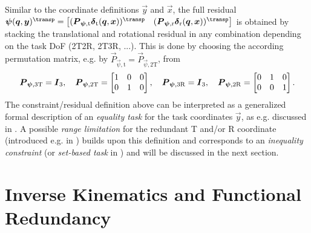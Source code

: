 \documentclass[graybox,vecphys]{svmult}
\newcommand{\bm}[1]{\boldsymbol{#1}}
\newcommand{\Res}[0]{\vec{\delta}}
\newcommand{\ResR}[0]{\vec{\psi}}
\begin{document}
Similar to the coordinate definitions $\vec{y}$ and $\vec{x}$, the full residual
$
\ResR(\vec{q},\vec{y})^\transp = \begin{bmatrix}
(\vec{P}_{\ResR, \mathrm{t}}\Res_\mathrm{t}(\vec{q},\vec{x}))^\transp &
(\vec{P}_{\ResR, \mathrm{r}}\Res_\mathrm{r}(\vec{q},\vec{x}))^\transp
\end{bmatrix}
$
is obtained by stacking the translational and rotational residual in any combination depending on the task DoF (2T2R, 2T3R, ...).
This is done by choosing the according permutation matrix, e.g. by $\vec{P}_{\ResR, \mathrm{t}}{=}\vec{P}_{\ResR, \mathrm{2T}}$, from 
%
\vspace{-0.1cm}
\begin{equation}
\vec{P}_{\ResR, \mathrm{3T}}=\bm{I}_3
,\quad
\vec{P}_{\ResR, \mathrm{2T}}=
\begin{bmatrix}
1 & 0 & 0  \\ 
0 & 1 & 0
\end{bmatrix}
,\quad
\vec{P}_{\ResR, \mathrm{3R}}=\bm{I}_3
,\quad
\vec{P}_{\ResR, \mathrm{2R}}=
\begin{bmatrix}
0 & 1 & 0  \\ 
0 & 0 & 1
\end{bmatrix}.
\vspace{-0.1cm}
\end{equation}
%
The constraint/residual definition above can be interpreted as a generalized formal description of an \emph{equality task} for the task coordinates $\vec{y}$, as e.g. discussed in \cite{MoeAntTeePet2016}.
A possible \emph{range limitation} for the redundant T and/or R coordinate (introduced e.g. in \cite{GuetaCheChiAra2011}) builds upon this definition and corresponds to an \emph{inequality constraint} (or \emph{set-based task} in \cite{MoeAntTeePet2016}) and will be discussed in the next section.


\section{Inverse Kinematics and Functional Redundancy}
\label{sec:inverse}
\end{document}
